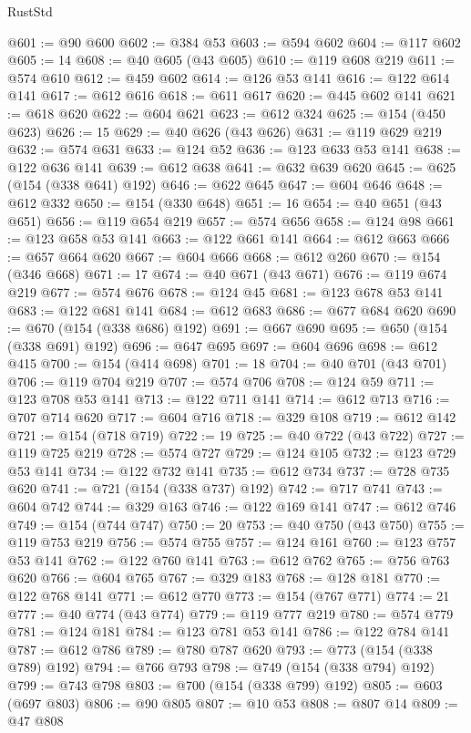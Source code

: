 \begin{lexlean}{RustStd}
\begin{coremodule}
@601 := @90 @600
@602 := @384 @53
@603 := @594 @602
@604 := @117 @602
@605 := 14
@608 := @40 @605 (@43 @605)
@610 := @119 @608 @219
@611 := @574 @610
@612 := @459 @602
@614 := @126 @53 @141
@616 := @122 @614 @141
@617 := @612 @616
@618 := @611 @617
@620 := @445 @602 @141
@621 := @618 @620
@622 := @604 @621
@623 := @612 @324
@625 := @154 (@450 @623)
@626 := 15
@629 := @40 @626 (@43 @626)
@631 := @119 @629 @219
@632 := @574 @631
@633 := @124 @52
@636 := @123 @633 @53 @141
@638 := @122 @636 @141
@639 := @612 @638
@641 := @632 @639 @620
@645 := @625 (@154 (@338 @641) @192)
@646 := @622 @645
@647 := @604 @646
@648 := @612 @332
@650 := @154 (@330 @648)
@651 := 16
@654 := @40 @651 (@43 @651)
@656 := @119 @654 @219
@657 := @574 @656
@658 := @124 @98
@661 := @123 @658 @53 @141
@663 := @122 @661 @141
@664 := @612 @663
@666 := @657 @664 @620
@667 := @604 @666
@668 := @612 @260
@670 := @154 (@346 @668)
@671 := 17
@674 := @40 @671 (@43 @671)
@676 := @119 @674 @219
@677 := @574 @676
@678 := @124 @45
@681 := @123 @678 @53 @141
@683 := @122 @681 @141
@684 := @612 @683
@686 := @677 @684 @620
@690 := @670 (@154 (@338 @686) @192)
@691 := @667 @690
@695 := @650 (@154 (@338 @691) @192)
@696 := @647 @695
@697 := @604 @696
@698 := @612 @415
@700 := @154 (@414 @698)
@701 := 18
@704 := @40 @701 (@43 @701)
@706 := @119 @704 @219
@707 := @574 @706
@708 := @124 @59
@711 := @123 @708 @53 @141
@713 := @122 @711 @141
@714 := @612 @713
@716 := @707 @714 @620
@717 := @604 @716
@718 := @329 @108
@719 := @612 @142
@721 := @154 (@718 @719)
@722 := 19
@725 := @40 @722 (@43 @722)
@727 := @119 @725 @219
@728 := @574 @727
@729 := @124 @105
@732 := @123 @729 @53 @141
@734 := @122 @732 @141
@735 := @612 @734
@737 := @728 @735 @620
@741 := @721 (@154 (@338 @737) @192)
@742 := @717 @741
@743 := @604 @742
@744 := @329 @163
@746 := @122 @169 @141
@747 := @612 @746
@749 := @154 (@744 @747)
@750 := 20
@753 := @40 @750 (@43 @750)
@755 := @119 @753 @219
@756 := @574 @755
@757 := @124 @161
@760 := @123 @757 @53 @141
@762 := @122 @760 @141
@763 := @612 @762
@765 := @756 @763 @620
@766 := @604 @765
@767 := @329 @183
@768 := @128 @181
@770 := @122 @768 @141
@771 := @612 @770
@773 := @154 (@767 @771)
@774 := 21
@777 := @40 @774 (@43 @774)
@779 := @119 @777 @219
@780 := @574 @779
@781 := @124 @181
@784 := @123 @781 @53 @141
@786 := @122 @784 @141
@787 := @612 @786
@789 := @780 @787 @620
@793 := @773 (@154 (@338 @789) @192)
@794 := @766 @793
@798 := @749 (@154 (@338 @794) @192)
@799 := @743 @798
@803 := @700 (@154 (@338 @799) @192)
@805 := @603 (@697 @803)
@806 := @90 @805
@807 := @10 @53
@808 := @807 @14
@809 := @47 @808

\end{coremodule}
\end{lexlean}
